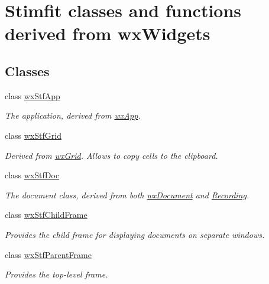 \hypertarget{group__wxstf}{
\section{Stimfit classes and functions derived from wxWidgets}
\label{group__wxstf}
}
\subsection*{Classes}
\begin{DoxyCompactItemize}
\item 
class \hyperlink{classwxStfApp}{wxStfApp}
\begin{DoxyCompactList}\small\item\em The application, derived from \hyperlink{classwxApp}{wxApp}. \item\end{DoxyCompactList}\item 
class \hyperlink{classwxStfGrid}{wxStfGrid}
\begin{DoxyCompactList}\small\item\em Derived from \hyperlink{classwxGrid}{wxGrid}. Allows to copy cells to the clipboard. \item\end{DoxyCompactList}\item 
class \hyperlink{classwxStfDoc}{wxStfDoc}
\begin{DoxyCompactList}\small\item\em The document class, derived from both \hyperlink{classwxDocument}{wxDocument} and \hyperlink{classRecording}{Recording}. \item\end{DoxyCompactList}\item 
class \hyperlink{classwxStfChildFrame}{wxStfChildFrame}
\begin{DoxyCompactList}\small\item\em Provides the child frame for displaying documents on separate windows. \item\end{DoxyCompactList}\item 
class \hyperlink{classwxStfParentFrame}{wxStfParentFrame}
\begin{DoxyCompactList}\small\item\em Provides the top-\/level frame. \item\end{DoxyCompactList}\item 

\end{DoxyCompactItemize}
